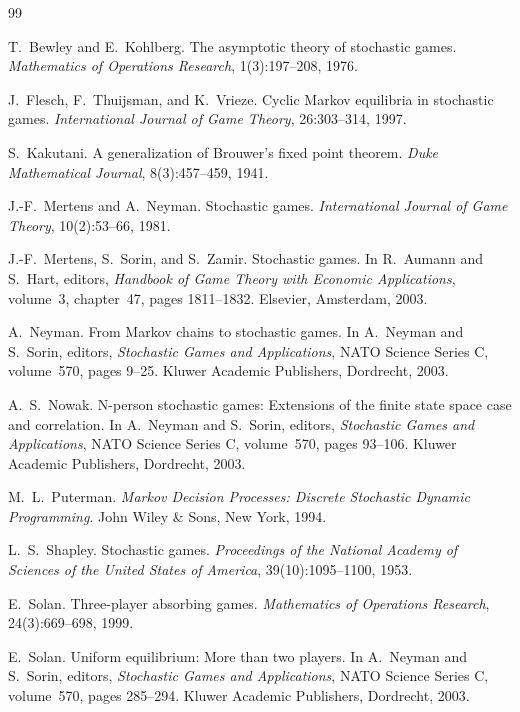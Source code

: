 \documentclass[12pt]{article}
\theoremstyle{definition}
\newcommand{\1}{\mathbf{1}}
\begin{document}
\begin{thebibliography}{99}


T.~Bewley and E.~Kohlberg.
\newblock The asymptotic theory of stochastic games.
\newblock \emph{Mathematics of Operations Research}, 1(3):197--208, 1976.

J.~Flesch, F.~Thuijsman, and K.~Vrieze.
\newblock Cyclic {M}arkov equilibria in stochastic games.
\newblock \emph{International Journal of Game Theory}, 26:303--314, 1997.

S.~Kakutani.
\newblock A generalization of {B}rouwer's fixed point theorem.
\newblock \emph{Duke Mathematical Journal}, 8(3):457--459, 1941.

J.-F.~Mertens and A.~Neyman.
\newblock Stochastic games.
\newblock \emph{International Journal of Game Theory}, 10(2):53--66, 1981.

J.-F.~Mertens, S.~Sorin, and S.~Zamir.
\newblock Stochastic games.
\newblock In R.~Aumann and S.~Hart, editors, \emph{Handbook of Game Theory with
Economic Applications}, volume~3, chapter~47, pages 1811--1832. Elsevier,
Amsterdam, 2003.

A.~Neyman.
\newblock From {M}arkov chains to stochastic games.
\newblock In A.~Neyman and S.~Sorin, editors, \emph{Stochastic Games and
Applications}, NATO Science Series C, volume~570, pages 9--25. Kluwer Academic
Publishers, Dordrecht, 2003.

A.~S.~Nowak.
\newblock N-person stochastic games: Extensions of the finite state space case and
correlation.
\newblock In A.~Neyman and S.~Sorin, editors, \emph{Stochastic Games and
Applications}, NATO Science Series C, volume~570, pages 93--106. Kluwer Academic
Publishers, Dordrecht, 2003.

M.~L.~Puterman.
\newblock \emph{Markov Decision Processes: Discrete Stochastic Dynamic
Programming}.
\newblock John Wiley \& Sons, New York, 1994.

L.~S.~Shapley.
\newblock Stochastic games.
\newblock \emph{Proceedings of the National Academy of Sciences of the United
States of America}, 39(10):1095--1100, 1953.

E.~Solan.
\newblock Three-player absorbing games.
\newblock \emph{Mathematics of Operations Research}, 24(3):669--698, 1999.

E.~Solan.
\newblock Uniform equilibrium: More than two players.
\newblock In A.~Neyman and S.~Sorin, editors, \emph{Stochastic Games and
Applications}, NATO Science Series C, volume~570, pages 285--294. Kluwer Academic
Publishers, Dordrecht, 2003.


\end{thebibliography}
\end{document}
